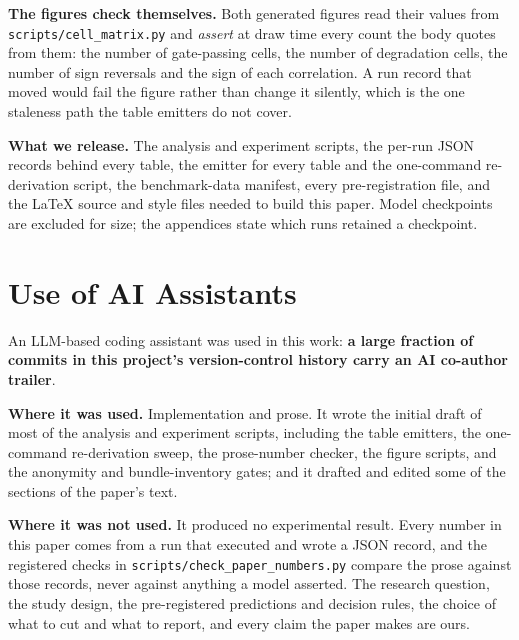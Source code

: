 \textbf{The figures check themselves.}  Both generated figures read their values
from \texttt{scripts/cell\_matrix.py} and \emph{assert} at draw time every count the
body quotes from them: the number of gate-passing cells, the number of degradation
cells, the number of sign reversals and the sign of each correlation.  A run record
that moved would fail the figure rather than change it silently, which is the one
staleness path the table emitters do not cover.

\textbf{What we release.}  The analysis and experiment scripts, the per-run JSON
records behind every table, the emitter for every table and the one-command
re-derivation script, the benchmark-data manifest, every pre-registration file, and
the \LaTeX{} source and style files needed to build this paper.  Model checkpoints
are excluded for size; the appendices state which runs retained a checkpoint.

\section*{Use of AI Assistants}

An LLM-based coding assistant was
used in this work: \textbf{a large fraction of commits in this project's
version-control history carry an AI co-author trailer}.

\textbf{Where it was used.}  Implementation and prose. It wrote the initial draft of most
of the analysis and experiment scripts, including the table emitters, the
one-command re-derivation sweep, the prose-number checker, the figure scripts, and
the anonymity and bundle-inventory gates; and it drafted and edited some of the sections of the paper's
text.

\textbf{Where it was not used.}  It produced no experimental result.  Every number
in this paper comes from a run that executed and wrote a JSON record, and the
registered checks in \texttt{scripts/check\_paper\_numbers.py} compare the prose
against those records, never against anything a model asserted.  The
research question, the study design, the pre-registered predictions and decision
rules, the choice of what to cut and what to report, and every claim the paper
makes are ours.

